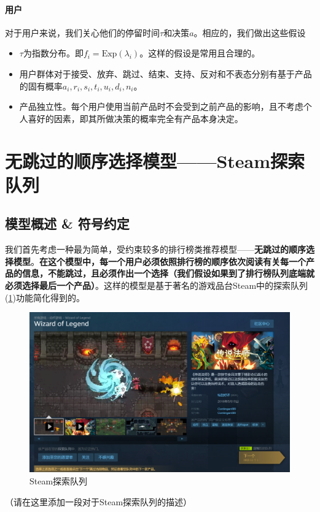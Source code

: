 \documentclass[UTF8]{ctexart}
\theoremstyle{plain}
\theoremstyle{definition}
\theoremstyle{remark}
\begin{document}
	\paragraph{用户} 对于用户来说，我们关心他们的停留时间$\tau$和决策$a$。相应的，我们做出这些假设
	\begin{itemize}
		\item $\tau$为指数分布。即$f_i = \mathrm{Exp}(\lambda_i)$。这样的假设是常用且合理的。
		\item 用户群体对于接受、放弃、跳过、结束、支持、反对和不表态分别有基于产品的固有概率$a_i,r_i,s_i,t_i,u_i,d_i,n_i$。
		\item 产品独立性。每个用户使用当前产品时不会受到之前产品的影响，且不考虑个人喜好的因素，即其所做决策的概率完全有产品本身决定。
	\end{itemize}
	
	\section{无跳过的顺序选择模型——Steam探索队列}
	\subsection{模型概述 \& 符号约定}
	我们首先考虑一种最为简单，受约束较多的排行榜类推荐模型——\textbf{无跳过的顺序选择模型}。\textbf{在这个模型中，每一个用户必须依照排行榜的顺序依次阅读有关每一个产品的信息，不能跳过，且必须作出一个选择（我们假设如果到了排行榜队列底端就必须选择最后一个产品）}。这样的模型是基于著名的游戏品台Steam中的探索队列(\ref{modelA_fig_1})功能简化得到的。
	\begin{figure}[H] 
		\centering
		\includegraphics[width = 12cm]{modelA_fig_1.png}
		\caption{Steam探索队列}\label{modelA_fig_1}
	\end{figure}
	（请在这里添加一段对于Steam探索队列的描述） \\
	
\end{document}
